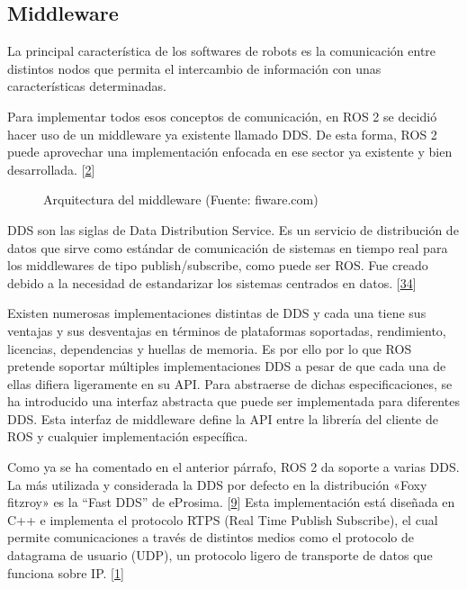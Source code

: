 \documentclass[a4paper,11pt,spanish]{sphinxmanual}
\let\sphinxpxdimen\pdfpxdimen\else\newdimen\sphinxpxdimen
\begin{document}
\subsection{Middleware}
\label{\detokenize{software:middleware}}
\sphinxAtStartPar
La principal característica de los softwares de robots es la
comunicación entre distintos nodos que permita el intercambio de
información con unas características determinadas.

\sphinxAtStartPar
Para implementar todos esos conceptos de comunicación, en ROS 2 se
decidió hacer uso de un middleware ya existente llamado DDS. De esta
forma, ROS 2 puede aprovechar una implementación enfocada en ese sector
ya existente y bien desarrollada. {[}\hyperlink{cite.marco_teorico_y_estado_del_arte:id21}{2}{]}

\begin{figure}[htbp]
\centering
\capstart

\noindent\sphinxincludegraphics[width=500\sphinxpxdimen]{{micro-ROS_middleware}.png}
\caption{Arquitectura del middleware (Fuente: fiware.com)}\label{\detokenize{software:id26}}\end{figure}

\sphinxAtStartPar
DDS son las siglas de Data Distribution Service. Es un servicio de
distribución de datos que sirve como estándar de comunicación de
sistemas en tiempo real para los middlewares de tipo publish/subscribe,
como puede ser ROS. Fue creado debido a la necesidad de estandarizar los
sistemas centrados en datos. {[}\hyperlink{cite.marco_teorico_y_estado_del_arte:id22}{34}{]}

\sphinxAtStartPar
Existen numerosas implementaciones distintas de DDS y cada una tiene sus
ventajas y sus desventajas en términos de plataformas soportadas,
rendimiento, licencias, dependencias y huellas de memoria. Es por ello
por lo que ROS pretende soportar múltiples implementaciones DDS a pesar
de que cada una de ellas difiera ligeramente en su API. Para abstraerse
de dichas especificaciones, se ha introducido una interfaz abstracta que
puede ser implementada para diferentes DDS. Esta interfaz de middleware
define la API entre la librería del cliente de ROS y cualquier
implementación específica.

\sphinxAtStartPar
Como ya se ha comentado en el anterior párrafo, ROS 2 da soporte a
varias DDS. La más utilizada y considerada la DDS por defecto en la
distribución «Foxy fitzroy» es la
“Fast DDS” de eProsima. {[}\hyperlink{cite.marco_teorico_y_estado_del_arte:id23}{9}{]}
Esta implementación está diseñada en C++ e
implementa el protocolo RTPS (Real Time Publish Subscribe), el cual
permite comunicaciones a través de distintos medios como el protocolo de
datagrama de usuario (UDP), un protocolo ligero de transporte de datos
que funciona sobre IP. {[}\hyperlink{cite.marco_teorico_y_estado_del_arte:id24}{1}{]}
\end{document}
